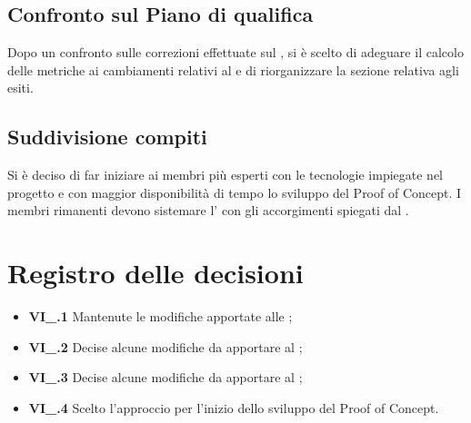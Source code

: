 \subsection{Confronto sul Piano di qualifica}
Dopo un confronto sulle correzioni effettuate sul \PdQ{}, si è scelto di adeguare il calcolo delle metriche ai cambiamenti relativi al \PdP{} e di riorganizzare la sezione relativa agli esiti.
\subsection{Suddivisione compiti}
Si è deciso di far iniziare ai membri più esperti con le tecnologie impiegate nel progetto e con maggior disponibilità di tempo lo sviluppo del Proof of Concept. I membri rimanenti devono sistemare l'\AdR{} con gli accorgimenti spiegati dal \CR{}.

\section{Registro delle decisioni}
\begin{itemize}
	\item \textbf{VI\_\Data.1} Mantenute le modifiche apportate alle \NdP{};
	\item \textbf{VI\_\Data.2} Decise alcune modifiche da apportare al \PdP{};
	\item \textbf{VI\_\Data.3} Decise alcune modifiche da apportare al \PdQ{};
	\item \textbf{VI\_\Data.4} Scelto l'approccio per l'inizio dello sviluppo del Proof of Concept.
\end{itemize}